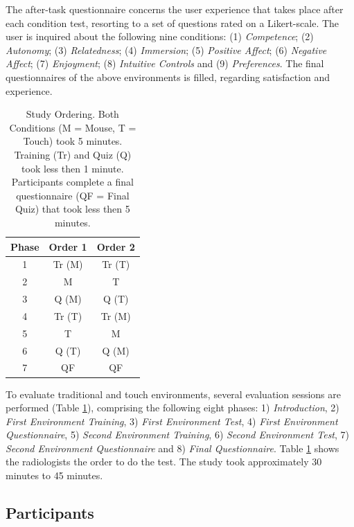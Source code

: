 \documentclass{sigchi}
\newcommand\tabhead[1]{\small\textbf{#1}}
\begin{document}
The after-task questionnaire concerns the user experience that takes place after each condition test, resorting to a set of questions rated on a Likert-scale. The user is inquired about the following nine conditions: (1) \textit{Competence}; (2) \textit{Autonomy}; (3) \textit{Relatedness}; (4) \textit{Immersion}; (5) \textit{Positive Affect}; (6) \textit{Negative Affect}; (7) \textit{Enjoyment}; (8) \textit{Intuitive Controls} and (9) \textit{Preferences}. The final questionnaires of the above environments is filled, regarding satisfaction and experience.

\begin{table}
  \centering
  \def\arraystretch{1.5}
  \begin{tabular}{|c|c|c|}
    \hline
    \tabhead{Phase} &
    \multicolumn{1}{|p{0.3\columnwidth}|}{\centering\tabhead{Order 1}} &
    \multicolumn{1}{|p{0.3\columnwidth}|}{\centering\tabhead{Order 2}} \\
    \hline
    1 & Tr (M) & Tr (T) \\
    \hline
    2 & M & T \\
    \hline
    3 & Q (M) & Q (T) \\
    \hline
    4 & Tr (T) & Tr (M) \\
    \hline
    5 & T & M \\
    \hline
    6 & Q (T) & Q (M) \\
    \hline
    7 & QF & QF \\
    \hline
  \end{tabular}
  \caption{Study Ordering. Both Conditions (M = Mouse, T = Touch) took 5 minutes. Training (Tr) and Quiz (Q) took less then 1 minute. Participants complete a final questionnaire (QF = Final Quiz) that took less then 5 minutes.}
  \label{tab:Tab1}
\end{table}

To evaluate traditional and touch environments, several evaluation sessions are  performed (Table \ref{tab:Tab1}), comprising the following eight phases: 1) \textit{Introduction}, 2) \textit{First Environment Training}, 3) \textit{First Environment Test}, 4) \textit{First Environment Questionnaire}, 5) \textit{Second Environment Training}, 6) \textit{Second Environment Test}, 7) \textit{Second Environment Questionnaire} and 8) \textit{Final Questionnaire}. Table \ref{tab:Tab1} shows the radiologists the order to do the test. The study took approximately 30 minutes to 45 minutes.

\subsection{Participants}
\end{document}
